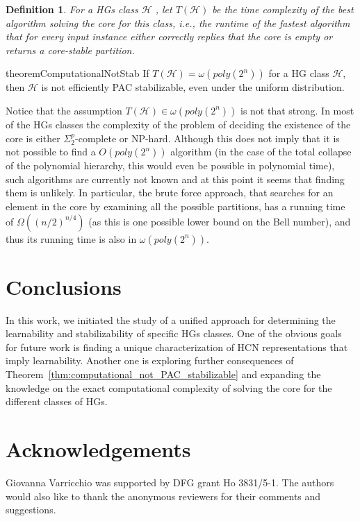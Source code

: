 \documentclass[letterpaper]{article} %
\newtheorem{definition}[theorem]{Definition}
\begin{document}
\begin{definition}For a HGs class $\mathcal{H}$ , let $T(\mathcal{H})$ be the time complexity of the best algorithm solving the core for this class, i.e., the runtime of the fastest algorithm that for every input instance either correctly replies that the core is empty or returns a core-stable partition.
\end{definition}

\begin{restatable}{theorem}{ComputationalNotStab}\label{thm:computational_not_PAC_stabilizable}
If $T(\mathcal{H}) = \omega(poly(2^n))$ for a HG class $\mathcal{H}$, then $\mathcal{H}$ is not efficiently PAC stabilizable, even under the uniform distribution. 
\end{restatable}

Notice that the assumption $T(\mathcal{H})\in \omega(poly(2^n))$ is not that strong. In most of the HGs classes the complexity of the problem of deciding the existence of the core is either $\Sigma_2^p$-complete or NP-hard. Although this does not imply that it is not possible to find a $O(poly(2^n))$ algorithm (in the case of the total collapse of the polynomial hierarchy, this would even be possible in polynomial time), such algorithms are currently not known and at this point it seems that finding them is unlikely. In particular, the brute force approach, that searches for an element in the core by examining all the possible partitions, has a running time of $\Omega((n/2)^{n/4})$ (as this is one possible lower bound on the Bell number), and thus its running time is also in $\omega(poly(2^n))$.

\section{Conclusions}
In this work, we initiated the study of a unified approach for determining the learnability and stabilizability of specific HGs classes. One of the obvious goals for future work is finding a unique characterization of HCN representations that imply learnability. Another one is exploring further consequences of Theorem~\ref{thm:computational_not_PAC_stabilizable} and expanding the knowledge on the exact computational complexity of solving the core for the different classes of HGs.

\section*{Acknowledgements}
Giovanna Varricchio was supported by DFG grant Ho 3831/5-1. 
The authors would also like to thank the anonymous reviewers for their comments and suggestions.

\clearpage
\appendix
\end{document}
